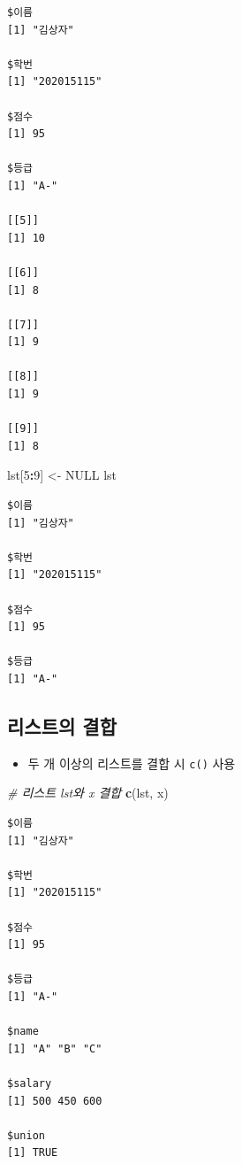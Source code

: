 \documentclass[
  11pt,
]{krantz}
\newenvironment{Shaded}{\begin{snugshade}}{\end{snugshade}}
\newcommand{\CommentTok}[1]{\textcolor[rgb]{0.37,0.37,0.37}{\textit{#1}}}
\newcommand{\DecValTok}[1]{\textcolor[rgb]{0.06,0.06,0.06}{#1}}
\newcommand{\KeywordTok}[1]{\textcolor[rgb]{0.27,0.27,0.27}{\textbf{#1}}}
\newcommand{\NormalTok}[1]{#1}
\newcommand{\OperatorTok}[1]{\textcolor[rgb]{0.43,0.43,0.43}{\textbf{#1}}}
\newcommand{\OtherTok}[1]{\textcolor[rgb]{0.37,0.37,0.37}{#1}}
\newcommand{\StringTok}[1]{\textcolor[rgb]{0.5,0.5,0.5}{#1}}
\providecommand{\tightlist}{%
  \setlength{\itemsep}{0pt}\setlength{\parskip}{0pt}}
\begin{document}
\begin{verbatim}
$이름
[1] "김상자"

$학번
[1] "202015115"

$점수
[1] 95

$등급
[1] "A-"

[[5]]
[1] 10

[[6]]
[1] 8

[[7]]
[1] 9

[[8]]
[1] 9

[[9]]
[1] 8
\end{verbatim}

\begin{Shaded}
\begin{Highlighting}[]
\NormalTok{lst[}\DecValTok{5}\OperatorTok{:}\DecValTok{9}\NormalTok{] <-}\StringTok{  }\OtherTok{NULL}
\NormalTok{lst}
\end{Highlighting}
\end{Shaded}

\begin{verbatim}
$이름
[1] "김상자"

$학번
[1] "202015115"

$점수
[1] 95

$등급
[1] "A-"
\end{verbatim}

\normalsize

\hypertarget{list-combine}{%
\subsection{리스트의 결합}\label{list-combine}}

\begin{itemize}
\tightlist
\item
  두 개 이상의 리스트를 결합 시 \texttt{c()} 사용
\end{itemize}

\footnotesize

\begin{Shaded}
\begin{Highlighting}[]
\CommentTok{# 리스트 lst와 x 결합}
\KeywordTok{c}\NormalTok{(lst, x)}
\end{Highlighting}
\end{Shaded}

\begin{verbatim}
$이름
[1] "김상자"

$학번
[1] "202015115"

$점수
[1] 95

$등급
[1] "A-"

$name
[1] "A" "B" "C"

$salary
[1] 500 450 600

$union
[1] TRUE
\end{verbatim}
\end{document}
